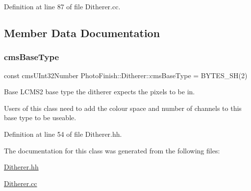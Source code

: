 Definition at line 87 of file Ditherer.\+cc.



\subsection{Member Data Documentation}
\mbox{\label{class_photo_finish_1_1_ditherer_a413cdf102c3544bb9535cfa6fe058a63}} 
\subsubsection{\texorpdfstring{cms\+Base\+Type}{cmsBaseType}}
{\footnotesize\ttfamily const cms\+U\+Int32\+Number Photo\+Finish\+::\+Ditherer\+::cms\+Base\+Type = B\+Y\+T\+E\+S\+\_\+\+SH(2)\hspace{0.3cm}{\ttfamily [static]}}



Base L\+C\+M\+S2 base type the ditherer expects the pixels to be in. 

Users of this class need to add the colour space and number of channels to this base type to be useable. 

Definition at line 54 of file Ditherer.\+hh.



The documentation for this class was generated from the following files\+:\begin{DoxyCompactItemize}
\item 
\hyperlink{_ditherer_8hh}{Ditherer.\+hh}\item 
\hyperlink{_ditherer_8cc}{Ditherer.\+cc}\end{DoxyCompactItemize}
